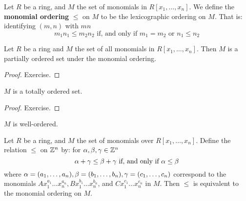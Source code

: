 \begin{definition}
  Let $R$ be a ring, and  $M$ the set of monomials in  $R[x_1, \dots,
  x_n]$. We define the \textbf{monomial ordering} $\leq$ on $M$ to be
  the lexicographic ordering on $M$. That is: identifying $(m,n)$ with
  $mn$
  \begin{equation*}
    m_1n_1 \leq m_2n_2 \text{ if, and only if }
    m_1=m_2 \text{ or }  n_1 \leq n_2
  \end{equation*}
\end{definition}

\begin{lemma}\label{lemma_7.5.2}
  Let $R$ be a ring and  $M$ the set of all monomials in  $R[x_1,
  \dots, x_n]$. Then $M$ is a partially ordered set under the monomial
  ordering.
\end{lemma}
\begin{proof}
  Exercise.
\end{proof}
\begin{corollary}
  $M$ is a totally ordered set.
\end{corollary}
\begin{proof}
  Exercise.
\end{proof}
\begin{corollary}
  $M$ is well-ordered.
\end{corollary}

\begin{lemma}\label{7.5.3}
  Let $R$ be a ring, and $M$ the set of monomials over $R[x_1, \dots,
  x_n]$. Define the relation $\leq$ on $\mathbb{Z}^n$ by: for $\alpha,\beta,\gamma \in
  \mathbb{Z}^n$
  \begin{equation*}
    \alpha+\gamma \leq \beta+\gamma \text{ if, and only if } \alpha \leq \beta
  \end{equation*}
  where $\alpha=(a_1, \dots ,a_n), \beta=(b_1, \dots, b_n), \gamma=(c_1, \dots,
  c_n)$ correspond to the monomials $Ax_1^{a_1} \dots x_n^{a_n},
  Bx_1^{b_1} \dots x_n^{b_n}$, and $Cx_1^{c_1} \dots x_n^{c_n}$ in
  $M$. Then $\leq$ is equivalent to the monomial ordering on $M$.
\end{lemma}
